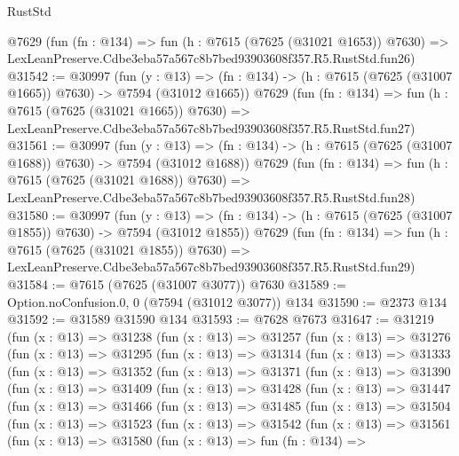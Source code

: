 \begin{lexlean}{RustStd}
\begin{coremodule}
    @7629
    (fun (fn : @134) =>
    fun (h : @7615 (@7625 (@31021 @1653)) @7630) =>
    LexLeanPreserve.Cdbe3eba57a567c8b7bed93903608f357.R5.RustStd.fun26)
@31542 := @30997
    (fun (y : @13) =>
    (fn : @134) -> (h : @7615 (@7625 (@31007 @1665)) @7630) -> @7594 (@31012 @1665))
    @7629
    (fun (fn : @134) =>
    fun (h : @7615 (@7625 (@31021 @1665)) @7630) =>
    LexLeanPreserve.Cdbe3eba57a567c8b7bed93903608f357.R5.RustStd.fun27)
@31561 := @30997
    (fun (y : @13) =>
    (fn : @134) -> (h : @7615 (@7625 (@31007 @1688)) @7630) -> @7594 (@31012 @1688))
    @7629
    (fun (fn : @134) =>
    fun (h : @7615 (@7625 (@31021 @1688)) @7630) =>
    LexLeanPreserve.Cdbe3eba57a567c8b7bed93903608f357.R5.RustStd.fun28)
@31580 := @30997
    (fun (y : @13) =>
    (fn : @134) -> (h : @7615 (@7625 (@31007 @1855)) @7630) -> @7594 (@31012 @1855))
    @7629
    (fun (fn : @134) =>
    fun (h : @7615 (@7625 (@31021 @1855)) @7630) =>
    LexLeanPreserve.Cdbe3eba57a567c8b7bed93903608f357.R5.RustStd.fun29)
@31584 := @7615 (@7625 (@31007 @3077)) @7630
@31589 := Option.noConfusion.{0, 0} (@7594 (@31012 @3077)) @134
@31590 := @2373 @134
@31592 := @31589 @31590 @134
@31593 := @7628 @7673
@31647 := @31219
    (fun (x : @13) =>
    @31238
      (fun (x : @13) =>
      @31257
        (fun (x : @13) =>
        @31276
          (fun (x : @13) =>
          @31295
            (fun (x : @13) =>
            @31314
              (fun (x : @13) =>
              @31333
                (fun (x : @13) =>
                @31352
                  (fun (x : @13) =>
                  @31371
                    (fun (x : @13) =>
                    @31390
                      (fun (x : @13) =>
                      @31409
                        (fun (x : @13) =>
                        @31428
                          (fun (x : @13) =>
                          @31447
                            (fun (x : @13) =>
                            @31466
                              (fun (x : @13) =>
                              @31485
                                (fun (x : @13) =>
                                @31504
                                  (fun (x : @13) =>
                                  @31523
                                    (fun (x : @13) =>
                                    @31542
                                      (fun (x : @13) =>
                                      @31561
                                        (fun (x : @13) =>
                                        @31580
                                          (fun (x : @13) =>
                                          fun (fn : @134) =>

\end{coremodule}
\end{lexlean}

